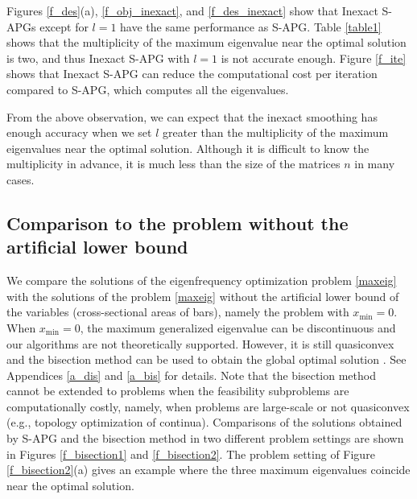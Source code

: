 \documentclass[sn-mathphys,Numbered]{sn-jnl}%
\theoremstyle{thmstyleone}%
\theoremstyle{thmstyletwo}%
\theoremstyle{thmstylethree}%
\begin{document}
Figures \ref{f_des}(a), \ref{f_obj_inexact}, and \ref{f_des_inexact} show that Inexact S-APGs except for $l=1$ have the same performance as S-APG. Table \ref{table1} shows that the multiplicity of the maximum eigenvalue near the optimal solution is two, and thus Inexact S-APG with $l=1$ is not accurate enough. Figure \ref{f_ite} shows that Inexact S-APG can reduce the computational cost per iteration compared to S-APG, which computes all the eigenvalues.

From the above observation, we can expect that the inexact smoothing has enough accuracy when we set $l$ greater than the multiplicity of the maximum eigenvalues near the optimal solution. Although it is difficult to know the multiplicity in advance, it is much less than the size of the matrices $n$ in many cases.

\subsection{Comparison to the problem without the artificial lower bound}

We compare the solutions of the eigenfrequency optimization problem \eqref{maxeig} with the solutions of the problem \eqref{maxeig} without the artificial lower bound of the variables (cross-sectional areas of bars), namely the problem with $x_\mathrm{min}=0$. When $x_\mathrm{min}=0$, the maximum generalized eigenvalue can be discontinuous and our algorithms are not theoretically supported. However, it is still quasiconvex and the bisection method can be used to obtain the global optimal solution \cite{achtziger07siam}. See Appendices \ref{a_dis} and \ref{a_bis} for details. Note that the bisection method cannot be extended to problems when the feasibility subproblems are computationally costly, namely, when problems are large-scale or not quasiconvex (e.g., topology optimization of continua). Comparisons of the solutions obtained by S-APG and the bisection method in two different problem settings are shown in Figures \ref{f_bisection1} and \ref{f_bisection2}. The problem setting of Figure \ref{f_bisection2}(a) gives an example where the three maximum eigenvalues coincide near the optimal solution.
\end{document}
